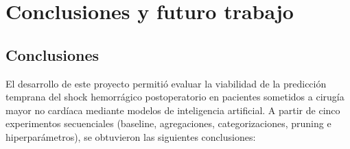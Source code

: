 \section{Conclusiones y futuro trabajo}

\subsection{Conclusiones}

El desarrollo de este proyecto permitió evaluar la viabilidad de la predicción temprana del shock hemorrágico postoperatorio en pacientes sometidos a cirugía mayor no cardíaca mediante modelos de inteligencia artificial. A partir de cinco experimentos secuenciales (baseline, agregaciones, categorizaciones, pruning e hiperparámetros), se obtuvieron las siguientes conclusiones:


